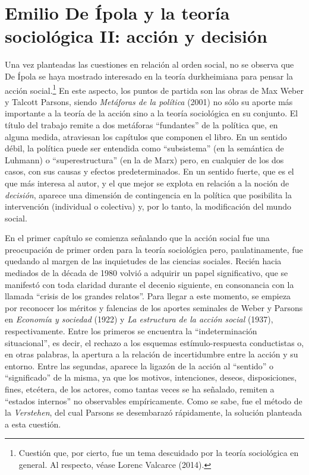 \section{Emilio De Ípola y la teoría sociológica II: acción y decisión}

Una vez planteadas las cuestiones en relación al orden social, no se observa que De Ípola se haya mostrado interesado en la teoría durkheimiana para pensar la acción social.\footnote{Cuestión que, por cierto, fue un tema descuidado por la teoría sociológica en general. Al respecto, véase Lorenc Valcarce (2014).} En este aspecto, los puntos de partida son las obras de Max Weber y Talcott Parsons, siendo \emph{Metáforas de la política} (2001) no sólo su aporte más importante a la teoría de la acción sino a la teoría sociológica en su conjunto. El título del trabajo remite a dos metáforas ``fundantes'' de la política que, en alguna medida, atraviesan los capítulos que componen el libro. En un sentido débil, la política puede ser entendida como ``subsistema'' (en la semántica de Luhmann) o ``superestructura'' (en la de Marx) pero, en cualquier de los dos casos, con sus causas y efectos predeterminados. En un sentido fuerte, que es el que más interesa al autor, y el que mejor se explota en relación a la noción de \emph{decisión}, aparece una dimensión de contingencia en la política que posibilita la intervención (individual o colectiva) y, por lo tanto, la modificación del mundo social.

En el primer capítulo se comienza señalando que la acción social fue una preocupación de primer orden para la teoría sociológica pero, paulatinamente, fue quedando al margen de las inquietudes de las ciencias sociales. Recién hacia mediados de la década de 1980 volvió a adquirir un papel significativo, que se manifestó con toda claridad durante el decenio siguiente, en consonancia con la llamada ``crisis de los grandes relatos''. Para llegar a este momento, se empieza por reconocer los méritos y falencias de los aportes seminales de Weber y Parsons en \emph{Economía y sociedad} (1922) y \emph{La estructura de la acción social} (1937), respectivamente. Entre los primeros se encuentra la ``indeterminación situacional'', es decir, el rechazo a los esquemas estímulo-respuesta conductistas o, en otras palabras, la apertura a la relación de incertidumbre entre la acción y su entorno. Entre las segundas, aparece la ligazón de la acción al ``sentido'' o ``significado'' de la misma, ya que los motivos, intenciones, deseos, disposiciones, fines, etcétera, de los actores, como tantas veces se ha señalado, remiten a ``estados internos'' no observables empíricamente. Como se sabe, fue el método de la \emph{Verstehen}, del cual Parsons se desembarazó rápidamente, la solución planteada a esta cuestión.

